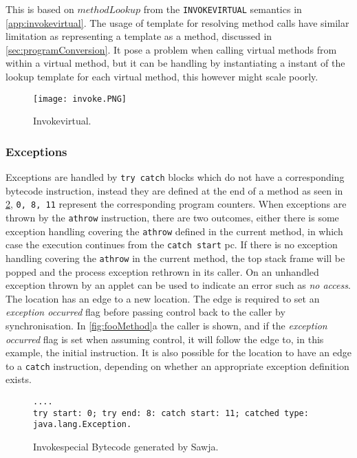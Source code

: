 \noindent This is based on $methodLookup$ from the \texttt{INVOKEVIRTUAL} semantics in \cref{app:invokevirtual}. The usage of template for resolving method calls have similar limitation as representing a template as a method, discussed in \cref{sec:programConversion}. It pose a problem when calling virtual methods from within a virtual method, but it can be handling by instantiating a instant of the lookup template for each virtual method, this however might scale poorly.

 
\begin{figure}[H]
\centering
\texttt{[image: invoke.PNG]}
\caption{Invokevirtual.}
\label{fig:invokevirtual}
\end{figure}

\subsubsection{Exceptions}
\label{sec:exceptions}
Exceptions are handled by \texttt{try catch} blocks which do not have a corresponding bytecode instruction, instead they are defined at the end of a method as seen in \cref{lst:exception}, \texttt{0, 8, 11} represent the corresponding program counters.
When exceptions are thrown by the \texttt{athrow} instruction, there are two outcomes, either there is some exception handling covering the \texttt{athrow} defined in the current method, in which case the execution continues from the \texttt{catch start} pc. 
If there is no exception handling covering the \texttt{athrow} in the current method, the top stack frame will be popped and the process exception rethrown in its caller. On \jc an unhandled exception thrown by an applet can be used to indicate an error such as \textit{no access}.\\

\noindent The  location has an edge to a new location. The edge is required to set an \textit{exception occurred} flag before passing control back to the caller by synchronisation. In \cref{fig:fooMethod}a the caller is shown, and if the \textit{exception occurred} flag is set when assuming control, it will follow the edge to, in this example, the initial instruction. It is also possible for the  location to have an edge to a \texttt{catch} instruction, depending on whether an appropriate exception definition exists.

\begin{figure}[H]
  \begin{lstlisting}
....
try start: 0; try end: 8: catch start: 11; catched type: java.lang.Exception.
  \end{lstlisting}
  \caption{Invokespecial Bytecode generated by Sawja.}
  \label{lst:exception}
\end{figure}



